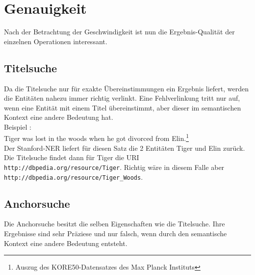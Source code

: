 \documentclass[11pt, a4paper, oneside]{Thesis} %
\begin{document}
\section{Genauigkeit}
Nach der Betrachtung der Geschwindigkeit ist nun die Ergebnis-Qualit\"at der einzelnen Operationen interessant.
\subsection{Titelsuche}
Da die Titelsuche nur f\"ur exakte \"Ubereinstimmungen ein Ergebnis liefert, werden die Entit\"aten nahezu immer richtig verlinkt. Eine Fehlverlinkung tritt nur auf, wenn eine Entit\"at mit einem Titel \"ubereinstimmt, aber dieser im semantischen Kontext eine andere Bedeutung hat.\\
Beispiel :\\
Tiger was lost in the woods when he got divorced from Elin.\footnote{Auszug des KORE50-Datensatzes des Max Planck Instituts} \\Der Stanford-NER liefert f\"ur diesen Satz die 2 Entit\"aten Tiger und Elin zur\"uck. Die Titelsuche findet dann f\"ur Tiger die URI \texttt{http://dbpedia.org/resource/Tiger}. Richtig w\"are in diesem Falle aber \texttt{http://dbpedia.org/resource/Tiger\_Woods}.

\subsection{Anchorsuche}
Die Anchorsuche besitzt die selben Eigenschaften wie die Titelsuche. Ihre Ergebnisse sind sehr Pr\"aziese und nur falsch, wenn durch den semantische Kontext eine andere Bedeutung entsteht.
\end{document}
